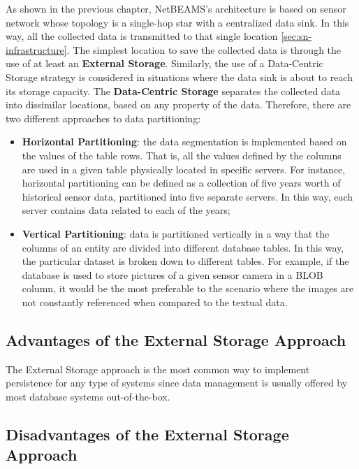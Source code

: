 As shown in the previous chapter, NetBEAMS's architecture is based on sensor
network whose topology is a single-hop star with a centralized data sink. In
this way, all the collected data is transmitted to that single location
\ref{sec:sn-infrastructure}. The simplest location to save the collected data
is through the use of at least an \textbf{External Storage}. Similarly, the
use of a Data-Centric Storage strategy is considered in situations where the
data sink is about to reach its storage capacity. The \textbf{Data-Centric
Storage} separates the collected data into dissimilar locations, based on any
property of the data. Therefore, there are two different approaches to data
partitioning:

\begin{itemize}
  \item \textbf{Horizontal Partitioning}: the data segmentation is implemented
  based on the values of the table rows. That is, all the values defined by the
  columns are used in a given table physically located in specific servers.
  For instance, horizontal partitioning can be defined as a collection of five
  years worth of historical sensor data, partitioned into five separate
  servers. In this way, each server contains data related to each of the years;
  \item \textbf{Vertical Partitioning}: data is partitioned vertically in a way
  that the columns of an entity are divided into different database tables. In
  this way, the particular dataset is broken down to different tables. For
  example, if the database is used to store pictures of a given sensor camera
  in a BLOB column, it would be the most preferable to the scenario where the
  images are not constantly referenced when compared to the textual data.
\end{itemize} 

\subsection{Advantages of the External Storage Approach}

The External Storage approach is the most common way to implement persistence
for any type of systems since data management is usually offered by most
database systems out-of-the-box. 

\subsection{Disadvantages of the External Storage Approach}

